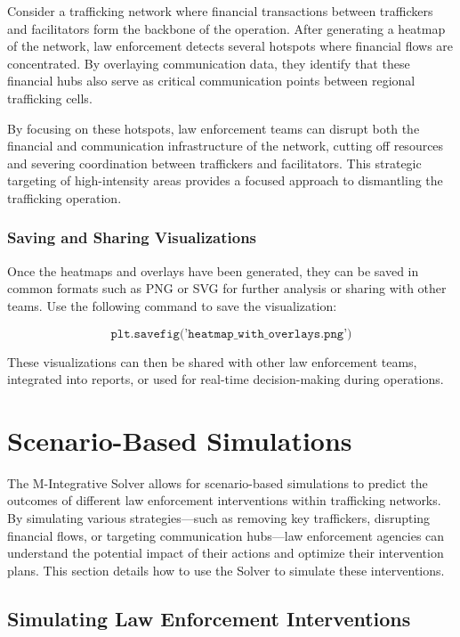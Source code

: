 \documentclass[%
 preprint, linenumbers,
 amsmath,amssymb,
 aps, physrev,
]{revtex4-2}
\begin{document}
Consider a trafficking network where financial transactions between traffickers and facilitators form the backbone of the operation. After generating a heatmap of the network, law enforcement detects several hotspots where financial flows are concentrated. By overlaying communication data, they identify that these financial hubs also serve as critical communication points between regional trafficking cells.

By focusing on these hotspots, law enforcement teams can disrupt both the financial and communication infrastructure of the network, cutting off resources and severing coordination between traffickers and facilitators. This strategic targeting of high-intensity areas provides a focused approach to dismantling the trafficking operation.

\subsubsection{Saving and Sharing Visualizations}

Once the heatmaps and overlays have been generated, they can be saved in common formats such as PNG or SVG for further analysis or sharing with other teams. Use the following command to save the visualization:

\[
\texttt{plt.savefig('heatmap\_with\_overlays.png')}
\]

These visualizations can then be shared with other law enforcement teams, integrated into reports, or used for real-time decision-making during operations.

\section{Scenario-Based Simulations}

The M-Integrative Solver allows for scenario-based simulations to predict the outcomes of different law enforcement interventions within trafficking networks. By simulating various strategies—such as removing key traffickers, disrupting financial flows, or targeting communication hubs—law enforcement agencies can understand the potential impact of their actions and optimize their intervention plans. This section details how to use the Solver to simulate these interventions.

\subsection{Simulating Law Enforcement Interventions}
\end{document}
